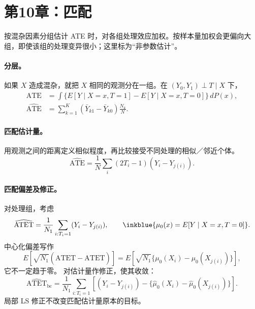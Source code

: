 {\section{第10章：匹配}
按混杂因素分组估计 ATE 时，对各组处理效应加权。按样本量加权会更偏向大组，即使该组的处理变异很小；这里标为“非参数估计”。

\paragraph{分层。}
如果 $X$ 造成混杂，就把 $X$ 相同的观测分在一组。在 $(Y_0,Y_1)\perp T\mid X$ 下，
\begin{align*}
\mathrm{ATE}&=\int\{E[Y\mid X=x,T=1]-E[Y\mid X=x,T=0]\}\,dP(x),\\
\widehat{\mathrm{ATE}}&=\sum_{k=1}^{K}(\bar Y_{k1}-\bar Y_{k0})\frac{N_k}{N}.
\end{align*}

\paragraph{匹配估计量。}
用观测之间的距离定义相似程度，再比较接受不同处理的相似／邻近个体。
\[\widehat{\mathrm{ATE}}=\frac1N\sum_i(2T_i-1)(Y_i-Y_{j(i)}).\]

\paragraph{匹配偏差及修正。}
对处理组，考虑
\[\widehat{\mathrm{ATET}}=\frac1{N_1}\sum_{i:T_i=1}(Y_i-Y_{j(i)}),\qquad
\inkblue{\mu_0(x)=E[Y\mid X=x,T=0]}.\]
中心化偏差写作
\[E[\sqrt{N_1}(\widehat{\mathrm{ATET}}-\mathrm{ATET})]
=E[\sqrt{N_1}\{\mu_0(X_i)-\mu_0(X_{j(i)})\}],\]
它不一定趋于零。 对估计量作修正，使其收敛：
\[\widehat{\mathrm{ATET}}_{\mathrm{bc}}=
\frac1{N_1}\sum_{i:T_i=1}\left[(Y_i-Y_{j(i)})-
\{\hat\mu_0(X_i)-\hat\mu_0(X_{j(i)})\}\right].\]
 局部 LS 修正不改变匹配估计量原本的目标。

}
